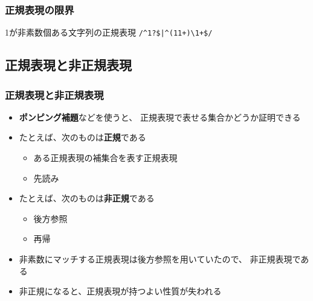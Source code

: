 \documentclass[12pt, unicode, svgnames]{beamer}
\begin{document}
\begin{frame}[fragile]
  \frametitle{正規表現の限界}

  \begin{block}{1が非素数個ある文字列の正規表現}
    \centering
    \LARGE
    \lstinline{/^1?$|^(11+)\1+$/}
  \end{block}

\end{frame}

\subsection{正規表現と非正規表現}
\begin{frame}[fragile]
  \frametitle{正規表現と非正規表現}

  \begin{itemize}
    \item<2-> \textbf{ポンピング補題}などを使うと、
      正規表現で表せる集合かどうか証明できる
    \item<3-> たとえば、次のものは\textbf{正規}である
      \begin{itemize}
        \item ある正規表現の補集合を表す正規表現
        \item 先読み
      \end{itemize}
    \item<4-> たとえば、次のものは\textbf{非正規}である
      \begin{itemize}
        \item 後方参照
        \item 再帰
      \end{itemize}
    \item<5-> 非素数にマッチする正規表現は後方参照を用いていたので、
      非正規表現である
    \item<6-> 非正規になると、正規表現が持つよい性質が失われる
  \end{itemize}
\end{frame}
\end{document}
